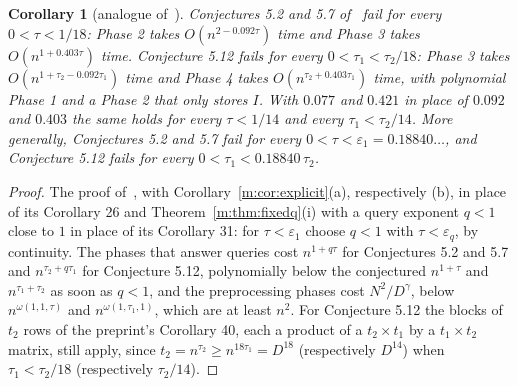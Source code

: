 \documentclass[11pt]{article}
\newtheorem{corollary}[theorem]{Corollary}
\theoremstyle{definition}
\theoremstyle{remark}
\newcommand{\HintedOMvRfourteen}{0.18840}%
\begin{document}
\begin{corollary}[analogue of~{\cite[Corollary 40]{ZT}}]\label{m:cor:omv}
Conjectures 5.2 and 5.7 of~\cite{BNS19} fail for every $0<\tau<1/18$: Phase 2 takes $O(n^{2-0.092\tau})$ time and Phase 3 takes $O(n^{1+0.403\tau})$ time. Conjecture 5.12 fails for every $0<\tau_1<\tau_2/18$: Phase 3 takes $O(n^{1+\tau_2-0.092\tau_1})$ time and Phase 4 takes $O(n^{\tau_2+0.403\tau_1})$ time, with polynomial Phase 1 and a Phase 2 that only stores $I$. With $0.077$ and $0.421$ in place of $0.092$ and $0.403$ the same holds for every $\tau<1/14$ and every $\tau_1<\tau_2/14$. More generally, Conjectures 5.2 and 5.7 fail for every $0<\tau<\varepsilon_1=\HintedOMvRfourteen\ldots$, and Conjecture 5.12 fails for every $0<\tau_1<\HintedOMvRfourteen\,\tau_2$.
\end{corollary}

\begin{proof}
The proof of~\cite[Corollary 40]{ZT}, with Corollary~\ref{m:cor:explicit}(a), respectively (b), in place of its Corollary 26 and Theorem~\ref{m:thm:fixedq}(i) with a query exponent $q<1$ close to $1$ in place of its Corollary 31: for $\tau<\varepsilon_1$ choose $q<1$ with $\tau<\varepsilon_q$, by continuity. The phases that answer queries cost $n^{1+q\tau}$ for Conjectures 5.2 and 5.7 and $n^{\tau_2+q\tau_1}$ for Conjecture 5.12, polynomially below the conjectured $n^{1+\tau}$ and $n^{\tau_1+\tau_2}$ as soon as $q<1$, and the preprocessing phases cost $N^2/D^\gamma$, below $n^{\omega(1,1,\tau)}$ and $n^{\omega(1,\tau_1,1)}$, which are at least $n^2$. For Conjecture 5.12 the blocks of $t_2$ rows of the preprint's Corollary 40, each a product of a $t_2\times t_1$ by a $t_1\times t_2$ matrix, still apply, since $t_2=n^{\tau_2}\ge n^{18\tau_1}=D^{18}$ (respectively $D^{14}$) when $\tau_1<\tau_2/18$ (respectively $\tau_2/14$).
\end{proof}
\end{document}
